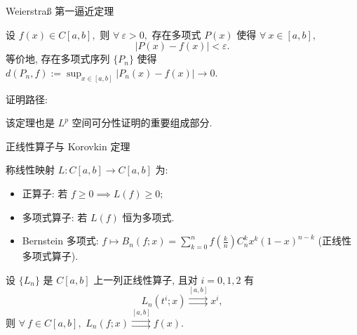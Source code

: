 \begin{frame}{Weierstraß 第一逼近定理}

\begin{thm}
设 $f(x) \in C[a, b],$ 则 $\forall~\varepsilon > 0,$ 存在多项式 $P(x)$ 使得 $\forall~x \in [a, b],$
\[|P(x) - f(x)| < \varepsilon.\]
等价地, 存在多项式序列 $\{P_n\}$ 使得 $d(P_n, f) := \sup_{x \in [a,b]} |P_n(x) - f(x)| \to 0.$
\end{thm}

\pause

证明路径:
\begin{center}
\end{center}

\pause

该定理也是 $L^p$ 空间可分性证明的重要组成部分.

\end{frame}


\begin{frame}{正线性算子与 Korovkin 定理}

\begin{Def}[正线性算子]
称线性映射 $L: C[a,b] \to C[a,b]$ 为:
\begin{itemize}
\item 正算子: 若 $f \geqslant 0 \implies L(f) \geqslant 0;$
\item 多项式算子: 若 $L(f)$ 恒为多项式.
\end{itemize}
\end{Def}

\pause

\begin{eg}
\begin{itemize}
\item {\color{red}Bernstein 多项式}: $f \mapsto B_n(f; x) = \sum_{k=0}^n f\!\left(\frac{k}{n}\right) C_n^k x^k (1-x)^{n-k}$ (正线性多项式算子).
\end{itemize}
\end{eg}

\pause

\begin{thm}[Korovkin 定理]
设 $\{L_n\}$ 是 $C[a,b]$ 上一列正线性算子, 且对 $i = 0, 1, 2$ 有
\[L_n(t^i; x) \stackrel{[a,b]}{\rightrightarrows} x^i,\]
则 $\forall~f \in C[a,b],$ $L_n(f; x) \stackrel{[a,b]}{\rightrightarrows} f(x).$
\end{thm}

\end{frame}


